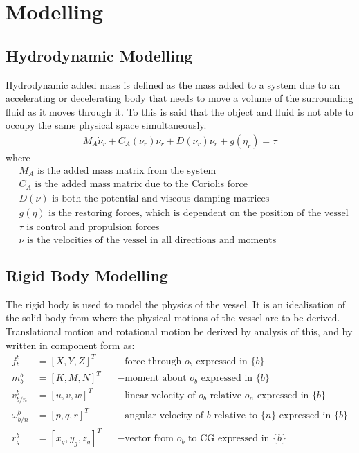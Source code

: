 \chapter{Modelling}

\section{Hydrodynamic Modelling}
Hydrodynamic added mass is defined as the mass added to a system due to an accelerating or decelerating body that needs to move a volume of the surrounding fluid as it moves through it. To this is said that the object and fluid is not able to occupy the same physical space simultaneously.
\begin{align}
M_A \dot \nu_r + C_A(\nu_r)\nu_r + D(\nu_r)\nu_r + g(\eta_r) = \tau
\label{eq:hydmodel}
\end{align}
where
\begin{align}
&M_A \text{ is the added mass matrix from the system}\nonumber\\
&C_A \text{ is the added mass matrix due to the Coriolis force}\nonumber\\
&D(\nu) \text{ is both the potential and viscous damping matrices}\nonumber\\
&g(\eta) \text{ is the restoring forces, which is dependent on the position of the vessel}\nonumber\\
&\tau \text{ is control and propulsion forces}\nonumber\\
&\nu \text{ is the velocities of the vessel in all directions and moments}
\end{align}

\section{Rigid Body Modelling}
The rigid body is used to model the physics of the vessel. It is an idealisation of the solid body from where the physical motions of the vessel are to be derived. Translational motion and rotational motion be derived by analysis of this, and by \citep{fossen} written in component form as:
\begin{align}
f^b_b &= [X,Y,Z]^T & &- \text{force through } o_b \text{ expressed in } \{b\}\\
m^b_b &= [K,M,N]^T & &- \text{moment about } o_b \text{ expressed in } \{b\}\\
v^b_{b/n} &= [u,v,w]^T & &- \text{linear velocity of } o_b \text{ relative } o_n \text{ expressed in } \{b\}\\
\omega^b_{b/n} &= [p,q,r]^T & &- \text{angular velocity of } {b} \text{ relative to } \{n\} \text{ expressed in } \{b\}\\
r^b_g &= [x_g,y_g,z_g]^T & &- \text{vector from } o_b \text{ to CG expressed in } \{b\}
\end{align}

